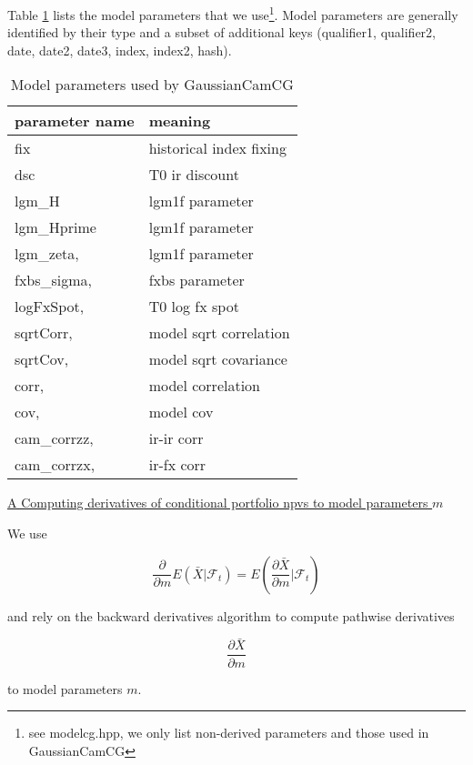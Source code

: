 Table \ref{tab:aad_modelparams} lists the model parameters that we use\footnote{see modelcg.hpp, we only list
non-derived parameters and those used in GaussianCamCG}. Model parameters are generally identified by their type and a
subset of additional keys (qualifier1, qualifier2, date, date2, date3, index, index2, hash).

\begin{table}[htb]
  \begin{tabular}{l|l}
            parameter name   & meaning \\
    \hline
            fix               & historical index fixing \\
            dsc               & T0 ir discount \\
            lgm\_H            & lgm1f parameter \\
            lgm\_Hprime       & lgm1f parameter \\
            lgm\_zeta,        & lgm1f parameter \\
            fxbs\_sigma,      & fxbs parameter \\
            logFxSpot,        & T0 log fx spot \\
            sqrtCorr,         & model sqrt correlation \\
            sqrtCov,          & model sqrt covariance \\
            corr,             & model correlation \\
            cov,              & model cov \\
            cam\_corrzz,      & ir-ir corr \\
            cam\_corrzx,      & ir-fx corr \\
    \hline
\end{tabular}
\caption{Model parameters used by GaussianCamCG}
\label{tab:aad_modelparams}
\end{table}

\underline{A Computing derivatives of conditional portfolio npvs to model parameters $m$}

We use

$$
\frac{\partial}{\partial m}E\left( \bar{X} \bigg| \mathcal{F}_t \right) = E\left( \frac{\partial \bar{X}}{\partial m} \bigg| \mathcal{F}_t \right)
$$

and rely on the backward derivatives algorithm to compute pathwise derivatives

$$
\frac{\partial \bar{X}}{\partial m}
$$

to model parameters $m$.


